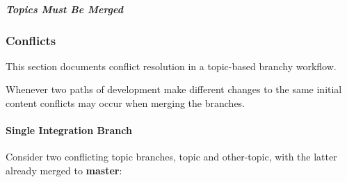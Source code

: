 \begin{figure}
\centering
{}
\label{fig:DeleteLocalBranch2}
\end{figure}


\subparagraph{Topics Must Be Merged}
\label{subpar:TopicsMustBeMerged}




\subsubsection{Conflicts}
\label{subsubsec:Conflicts}

This section documents conflict resolution in a topic-based branchy workflow.

Whenever two paths of development make different changes to the same initial
content conflicts may occur when merging the branches.


\paragraph{Single Integration Branch}
\label{par:SingleIntegrationBranch}

Consider two conflicting topic branches, topic and other-topic, with the latter
already merged to \textbf{master}:

\begin{figure}
\centering
{}
\label{fig:ConflictingTopicBranches1}
\end{figure}

